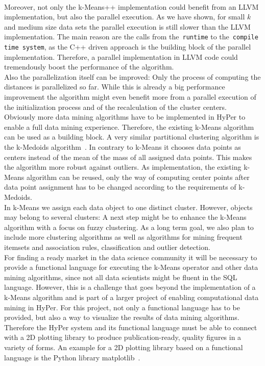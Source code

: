 \\
Moreover, not only the k-Means++ implementation could benefit from an LLVM implementation, but also the parallel execution. As we have shown, for small $k$ and medium size data sets the parallel execution is still slower than the LLVM implementation. The main reason are the calls from the~\texttt{runtime} to the~\texttt{compile time system}, as the C++ driven approach is the building block of the parallel implementation. Therefore, a parallel implementation in LLVM code could tremendously boost the performance of the algorithm. 
\\
Also the parallelization itself can be improved: Only the process of computing the distances is parallelized so far. While this is already a big performance improvement the algorithm might even benefit more from a parallel execution of the initialization process and of the recalculation of the cluster centers.
\\
Obviously more data mining algorithms have to be implemented in HyPer to enable a full data mining experience. Therefore, the existing k-Means algorithm can be used as a building block. A very similar partitional clustering algorithm is the k-Medoids algorithm~\parencite{medoid}. In contrary to k-Means it chooses data points as centers instead of the mean of the mass of all assigned data points. This makes the algorithm more robust against outliers. As implementation, the existing k-Means algorithm can be reused, only the way of computing center points after data point assignment has to be changed according to the requirements of k-Medoids. 
\\
In k-Means we assign each data object to one distinct cluster. However, objects may belong to several clusters: A next step might be to enhance the k-Means algorithm with a focus on fuzzy clustering. As a long term goal, we also plan to include more clustering algorithms as well as algorithms for mining frequent itemsets and association rules, classification and outlier detection.
\\
For finding a ready market in the data science community it will be necessary to provide a functional language for executing the k-Means operator and other data mining algorithms, since not all data scientists might be fluent in the SQL language. However, this is a challenge that goes beyond the implementation of a k-Means algorithm and is part of a larger project of enabling computational data mining in HyPer. For this project, not only a functional language has to be provided, but also a way to visualize the results of data mining algorithms. Therefore the HyPer system and its functional language must be able to connect with a 2D plotting library to produce publication-ready, quality figures in a variety of forms. An example for a 2D plotting library based on a functional language is the Python library matplotlib~\parencite{Hunter:2007}. 





